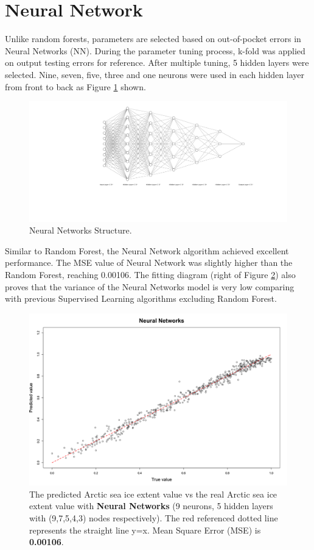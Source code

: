 \section{Neural Network} %

Unlike random forests, parameters are selected based on out-of-pocket errors in Neural Networks (NN). During the parameter tuning process, k-fold was applied on output testing errors for reference. After multiple tuning, 5 hidden layers were selected. Nine, seven, five, three and one neurons were used in each hidden layer from front to back as Figure \ref{4.2.5-NN-Structure} shown.

\begin{figure}[htbp]
\centering
\includegraphics[width = 1.0\textwidth]{Figure/4.2.5-NN-Structure.pdf}
\caption{Neural Networks Structure.}
\label{4.2.5-NN-Structure}
\end{figure}


Similar to Random Forest, the Neural Network algorithm achieved excellent performance. The MSE value of Neural Network was slightly higher than the Random Forest, reaching 0.00106. The fitting diagram (right of Figure \ref{4.2.5-NN}) also proves that the variance of the Neural Networks model is very low comparing with previous Supervised Learning algorithms excluding Random Forest.


\begin{figure}[htbp]
\centering
\includegraphics[width = 1.0\textwidth]{Figure/4.2.5-NN.png}
\caption{The predicted Arctic sea ice extent value vs the real Arctic sea ice extent value with \textbf{Neural Networks} (9 neurons, 5 hidden layers with (9,7,5,4,3) nodes respectively). The red referenced dotted line represents the straight line y=x. Mean Square Error (MSE) is \textbf{0.00106}.}
\label{4.2.5-NN}
\end{figure}


\newpage